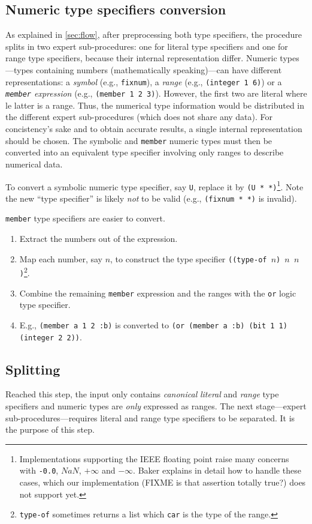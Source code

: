 \documentclass[format=sigconf]{acmart}
\newcommand\code[2][\small]{\sloppy\texttt{#1#2}}
\newcommand\footcode[1]{\code[\scriptsize]{#1}}
\theoremstyle{definition}
\begin{document}
\subsection{Numeric type specifiers conversion}
As explained in \vref{sec:flow}, after preprocessing both type specifiers, the
procedure splits in two expert sub-procedures: one for literal type specifiers
and one for range type specifiers, because their internal representation differ.
Numeric types---types containing numbers (mathematically speaking)---can have
different representations: a \emph{symbol} (e.g., \code{fixnum}), a \emph{range}
(e.g., \code{(integer 1 6)}) or a \emph{\code{member} expression}
(e.g., \code{(member 1 2 3)}). However, the first two are literal where le
latter is a range. Thus, the numerical type information would be distributed in
the different expert sub-procedures (which does not share any data). For
concistency's sake and to obtain accurate results, a single internal
representation should be chosen. The symbolic and \code{member} numeric types
must then be converted into an equivalent type specifier involving only ranges
to describe numerical data.

To convert a symbolic numeric type specifier, say \code{U}, replace it by
\code{(U * *)}\footnote{Implementations supporting the IEEE floating point
  raise many concerns with \footcode{-0.0}, $NaN$, $+\infty$ and $-\infty$.
  Baker explains in detail how to handle these cases, which our implementation
  (FIXME is that assertion totally true?)
  does not support yet.}. Note the new ``type specifier'' is likely
\emph{not} to be valid (e.g., \code{(fixnum * *)} is invalid).

\code{member} type specifiers are easier to convert.
\begin{enumerate}
\item Extract the numbers out of the expression.
\item Map each number, say $n$, to construct the type specifier
  \code{((type-of $n$) $n$ $n$)}\footnote{\footcode{type-of} sometimes
    returns a list which \footcode{car} is the type of the range.}.
\item Combine the remaining \code{member} expression and the ranges with the
  \code{or} logic type specifier.
\item E.g., \code{(member a 1 2 :b)} is converted to
  \code{(or (member a :b) (bit 1 1) (integer 2 2))}.
\end{enumerate}

\subsection{Splitting}
Reached this step, the input only contains \emph{canonical} \emph{literal} and
\emph{range} type specifiers and numeric types are \emph{only} expressed as
ranges. The next stage---expert sub-procedures---requires literal and range type
specifiers to be separated. It is the purpose of this step.
\end{document}
